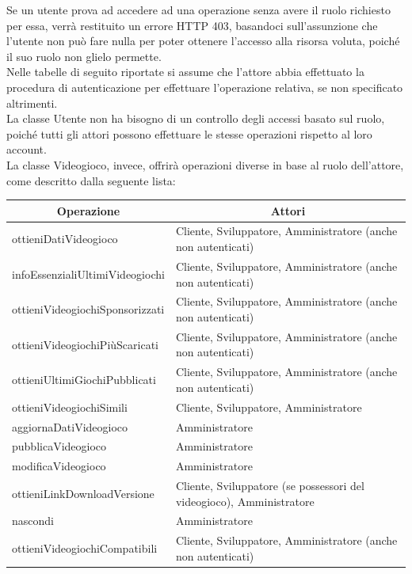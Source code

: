 Se un utente prova ad accedere ad una operazione senza avere il ruolo richiesto per essa, verrà restituito un errore HTTP 403, basandoci sull’assunzione che l’utente non può fare nulla per poter ottenere l’accesso alla risorsa voluta, poiché il suo ruolo non glielo permette.\\
Nelle tabelle di seguito riportate si assume che l’attore abbia effettuato la procedura di autenticazione per effettuare l’operazione relativa, se non specificato altrimenti.\\
La classe Utente non ha bisogno di un controllo degli accessi basato sul ruolo, poiché tutti gli attori possono effettuare le stesse operazioni rispetto al loro account.\\
La classe Videogioco, invece, offrirà operazioni diverse in base al ruolo dell’attore, come descritto dalla seguente lista:
\begin{center}
	\begin{tabular}{||l | p{16.5em}||} 
	\hline
	\multicolumn{1}{||c|}{\textbf{Operazione}} & \multicolumn{1}{c||}{\textbf{Attori}} \\
	\hline\hline
	ottieniDatiVideogioco & Cliente, Sviluppatore, Amministratore (anche non autenticati) \\ 
	\hline
	infoEssenzialiUltimiVideogiochi & Cliente, Sviluppatore, Amministratore (anche non autenticati) \\ 
	\hline
	ottieniVideogiochiSponsorizzati & Cliente, Sviluppatore, Amministratore (anche non autenticati) \\ 
	\hline
	ottieniVideogiochiPiùScaricati & Cliente, Sviluppatore, Amministratore (anche non autenticati) \\ 
	\hline
	ottieniUltimiGiochiPubblicati & Cliente, Sviluppatore, Amministratore (anche non autenticati) \\ 
	\hline
	ottieniVideogiochiSimili & Cliente, Sviluppatore, Amministratore \\ 
	\hline
	aggiornaDatiVideogioco & Amministratore \\ 
	\hline
	pubblicaVideogioco & Amministratore \\ 
	\hline
	modificaVideogioco & Amministratore \\ 
	\hline
	ottieniLinkDownloadVersione & Cliente, Sviluppatore (se possessori del videogioco), Amministratore \\
	\hline
	nascondi & Amministratore \\
	\hline
	ottieniVideogiochiCompatibili & Cliente, Sviluppatore, Amministratore (anche non autenticati) \\
	\hline
   \end{tabular}
\end{center}

